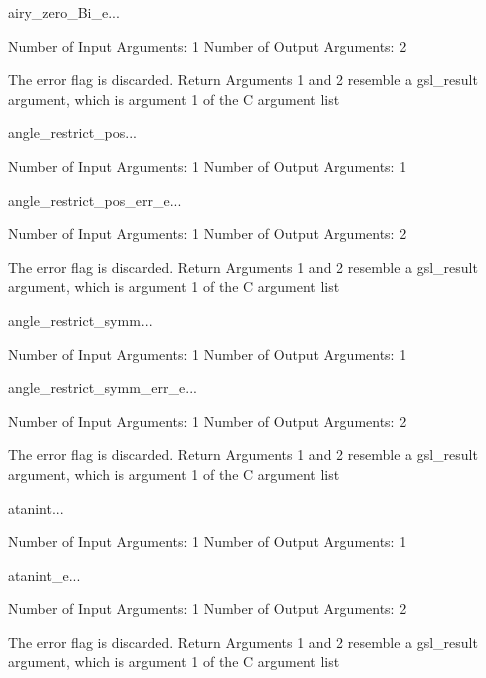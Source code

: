 \begin{funcdesc}{airy_zero_Bi_e}{...}

    Number of Input  Arguments:  1
    Number of Output Arguments:  2

The error flag is discarded.
Return Arguments 1 and 2 resemble a gsl_result argument,
	which is  argument 1 of the C argument list

\end{funcdesc}

\begin{funcdesc}{angle_restrict_pos}{...}

    Number of Input  Arguments:  1
    Number of Output Arguments:  1
\end{funcdesc}

\begin{funcdesc}{angle_restrict_pos_err_e}{...}

    Number of Input  Arguments:  1
    Number of Output Arguments:  2

The error flag is discarded.
Return Arguments 1 and 2 resemble a gsl_result argument,
	which is  argument 1 of the C argument list

\end{funcdesc}

\begin{funcdesc}{angle_restrict_symm}{...}

    Number of Input  Arguments:  1
    Number of Output Arguments:  1
\end{funcdesc}

\begin{funcdesc}{angle_restrict_symm_err_e}{...}

    Number of Input  Arguments:  1
    Number of Output Arguments:  2

The error flag is discarded.
Return Arguments 1 and 2 resemble a gsl_result argument,
	which is  argument 1 of the C argument list

\end{funcdesc}

\begin{funcdesc}{atanint}{...}

    Number of Input  Arguments:  1
    Number of Output Arguments:  1
\end{funcdesc}

\begin{funcdesc}{atanint_e}{...}

    Number of Input  Arguments:  1
    Number of Output Arguments:  2

The error flag is discarded.
Return Arguments 1 and 2 resemble a gsl_result argument,
	which is  argument 1 of the C argument list

\end{funcdesc}

